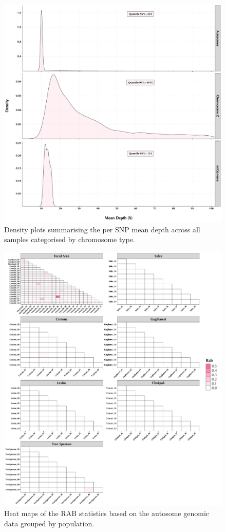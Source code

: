 \begin{figure}
    \centering
    \includegraphics[width=\linewidth]{Figures/Y150239Genomics--MeanDepth.pdf}
    \caption{Density plots summarising the per SNP mean depth across all samples categorised by chromosome type.}
    \label{fig:SIfigure-02}
\end{figure}

\begin{figure}
    \centering
    \includegraphics[width=\linewidth]{Figures/Y150239Genomics--Kinship.pdf}
    \caption{Heat maps of the RAB statistics based on the autosome genomic data grouped by population.}
    \label{fig:SIfigure-03}
\end{figure}

